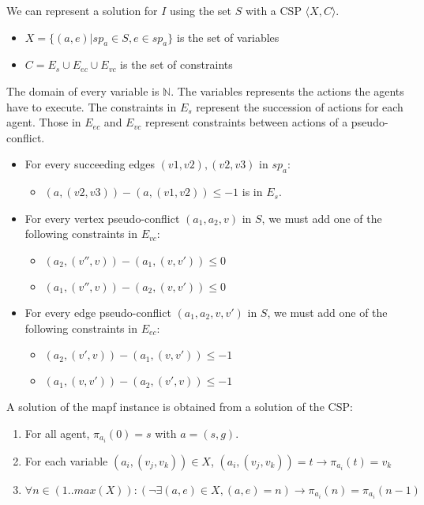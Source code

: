 We can represent a solution for $I$ using the set $S$ with a CSP $\langle X,C \rangle.$
\begin{itemize}
  \item $X = \{(a,e) | sp_a \in S, e \in sp_a \}$ is the set of variables
  \item $C = E_s \cup E_{ec} \cup E_{vc}$ is the set of constraints
\end{itemize}
The domain of every variable is $ {\displaystyle \mathbb {N} }$.
The variables represents the actions the agents have to execute.
The constraints in $E_s$ represent the succession of actions for each agent. Those in $E_{ec}$ and $E_{vc}$ represent constraints between actions of a pseudo-conflict.

\begin{itemize}
  \item For every succeeding edges $(v1,v2),(v2,v3)$ in $sp_a$:
  \begin{itemize}
    \item $(a,(v2,v3)) - (a,(v1,v2)) \leq -1$ is in $E_s$. 
  \end{itemize}
  \item For every vertex pseudo-conflict $(a_1,a_2,v)$ in $S$, we must add one of the following constraints in $E_{vc}$:
  \begin{itemize}
    \item $(a_2,(v'',v)) - (a_1,(v,v')) \leq 0$
    \item $(a_1,(v'',v)) - (a_2,(v,v')) \leq 0$
  \end{itemize}
  \item For every edge pseudo-conflict $(a_1,a_2,v,v')$ in $S$, we must add one of the following constraints in $E_{ec}$:
  \begin{itemize}
    \item $(a_2,(v',v)) - (a_1,(v,v')) \leq -1$
    \item $(a_1,(v,v')) - (a_2,(v',v)) \leq -1$
  \end{itemize}
\end{itemize}

A solution of the mapf instance is obtained from a solution of the CSP:
\begin{enumerate}
  \item For all agent, $\pi_{a_i}(0)=s$ with $a=(s,g)$.
  \item For each variable $(a_i,(v_j,v_k)) \in X$, $(a_i,(v_j,v_k))=t \rightarrow \pi_{a_i}(t)=v_k$
  \item $\forall n \in (1..max(X)): ( \neg\exists (a,e) \in X, (a,e)=n ) \rightarrow \pi_{a_i}(n)=\pi_{a_i}(n-1)$
\end{enumerate}
